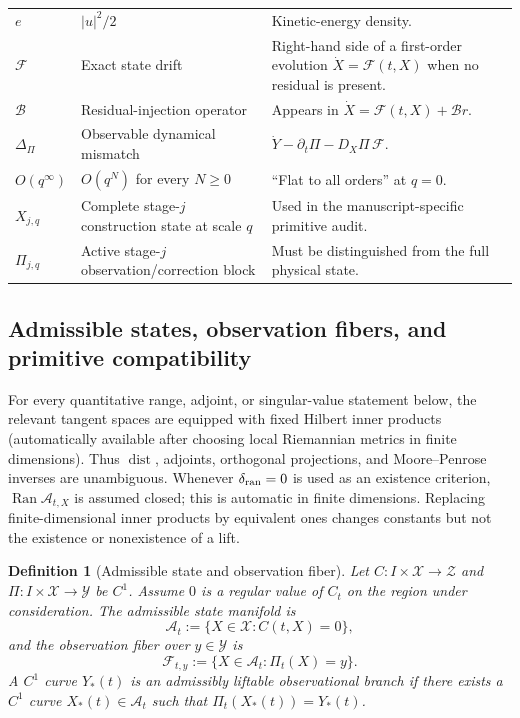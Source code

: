 \documentclass[12pt]{article}
\newtheorem{definition}[theorem]{Definition}
\newcommand{\A}{\mathcal A}
\newcommand{\X}{\mathcal X}
\newcommand{\Y}{\mathcal Y}
\newcommand{\Zs}{\mathcal Z}
\newcommand{\Ran}{\operatorname{Ran}}
\newcommand{\dist}{\operatorname{dist}}
\newcommand{\Comp}{\mathscr A}
\newcommand{\Fib}{\mathscr F}
\begin{document}
\begin{longtable}{p{}p{}p{}}
$e$ & $|u|^2/2$ & Kinetic-energy density. \\
$\mathcal F$ & Exact state drift & Right-hand side of a first-order evolution $\dot X=\mathcal F(t,X)$ when no residual is present. \\
$\mathcal B$ & Residual-injection operator & Appears in $\dot X=\mathcal F(t,X)+\mathcal B r$. \\
$\Delta_\Pi$ & Observable dynamical mismatch & $\dot Y-\partial_t\Pi-D_X\Pi\,\mathcal F$. \\
$O(q^\infty)$ & $O(q^N)$ for every $N\ge0$ & ``Flat to all orders'' at $q=0$. \\
$X_{j,q}$ & Complete stage-$j$ construction state at scale $q$ & Used in the manuscript-specific primitive audit. \\
$\Pi_{j,q}$ & Active stage-$j$ observation/correction block & Must be distinguished from the full physical state. \\
\bottomrule
\end{longtable}
\renewcommand{\arraystretch}{1}

\subsection{Admissible states, observation fibers, and primitive compatibility}
For every quantitative range, adjoint, or singular-value statement below, the relevant tangent spaces are equipped with fixed Hilbert inner products (automatically available after choosing local Riemannian metrics in finite dimensions). Thus $\dist$, adjoints, orthogonal projections, and Moore--Penrose inverses are unambiguous. Whenever $\delta_{\rm ran}=0$ is used as an existence criterion, $\Ran\Comp_{t,X}$ is assumed closed; this is automatic in finite dimensions. Replacing finite-dimensional inner products by equivalent ones changes constants but not the existence or nonexistence of a lift.

\begin{definition}[Admissible state and observation fiber]\label{def:admissible-fiber}
Let $C:I\times\X\to\Zs$ and $\Pi:I\times\X\to\Y$ be $C^1$. Assume $0$ is a regular value of $C_t$ on the region under consideration. The admissible state manifold is
\[
\A_t:=\{X\in\X:C(t,X)=0\},
\]
and the observation fiber over $y\in\Y$ is
\[
\Fib_{t,y}:=\{X\in\A_t:\Pi_t(X)=y\}.
\]
A $C^1$ curve $Y_*(t)$ is an \emph{admissibly liftable observational branch} if there exists a $C^1$ curve $X_*(t)\in\A_t$ such that $\Pi_t(X_*(t))=Y_*(t)$.
\end{definition}
\end{document}

